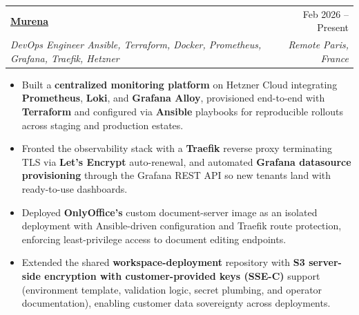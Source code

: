 \documentclass[letterpaper,11pt]{article}
\makeatletter
\newcommand{\resumeItem}[1]{
  \item\small{
    {#1 \vspace{-2pt}}
  }
}
\newcommand{\resumeSubheading}[4]{
  \vspace{-1pt}\item
    \begin{tabular*}{0.97\textwidth}[t]{l@{\extracolsep{\fill}}r}
      \textbf{#1} & #2 \\
      \textit{\small#3} & \textit{\small #4} \\
    \end{tabular*}\vspace{-5pt}
}
\newcommand{\resumeItemListStart}{\begin{itemize}}
\newcommand{\resumeItemListEnd}{\end{itemize}\vspace{-4pt}}
\makeatother
\begin{document}
\resumeSubheading
  {\href{https://murena.io}{\underline{Murena}}}{Feb 2026 -- Present}
  {DevOps Engineer \textbar{} Ansible, Terraform, Docker, Prometheus, Grafana, Traefik, Hetzner}{Remote \textperiodcentered{} Paris, France}
\resumeItemListStart
  \resumeItem{Built a \textbf{centralized monitoring platform} on Hetzner Cloud integrating \textbf{Prometheus}, \textbf{Loki}, and \textbf{Grafana Alloy}, provisioned end-to-end with \textbf{Terraform} and configured via \textbf{Ansible} playbooks for reproducible rollouts across staging and production estates.}
  \resumeItem{Fronted the observability stack with a \textbf{Traefik} reverse proxy terminating TLS via \textbf{Let's Encrypt} auto-renewal, and automated \textbf{Grafana datasource provisioning} through the Grafana REST API so new tenants land with ready-to-use dashboards.}
  \resumeItem{Deployed \textbf{OnlyOffice's} custom document-server image as an isolated deployment with Ansible-driven configuration and Traefik route protection, enforcing least-privilege access to document editing endpoints.}
  \resumeItem{Extended the shared \textbf{workspace-deployment} repository with \textbf{S3 server-side encryption with customer-provided keys (SSE-C)} support (environment template, validation logic, secret plumbing, and operator documentation), enabling customer data sovereignty across deployments.}
\resumeItemListEnd
\end{document}
